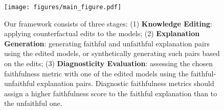 \begin{figure}
    \centering
    \texttt{[image: figures/main\_figure.pdf]}
    \caption{Our framework consists of three stages: (1) \textbf{Knowledge Editing}: applying counterfactual edits to the models; (2) \textbf{Explanation Generation}: generating faithful and unfaithful explanation pairs using the edited models, or synthetically generating such pairs based on the edits; (3) \textbf{Diagnosticity Evaluation}: assessing the chosen faithfulness metric with one of the edited models using the faithful-unfaithful explanation pairs. Diagnostic faithfulness metrics should assign a higher faithfulness score to the faithful explanation than to the unfaithful one.}
    \label{fig:method_overview}
\end{figure}


